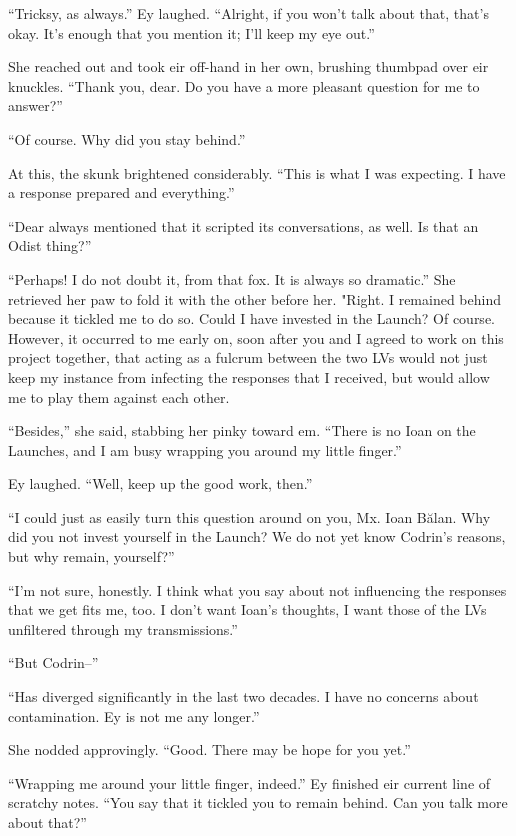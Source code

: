 ``Tricksy, as always.'' Ey laughed. ``Alright, if you won't talk about that, that's okay. It's enough that you mention it; I'll keep my eye out.''

She reached out and took eir off-hand in her own, brushing thumbpad over eir knuckles. ``Thank you, dear. Do you have a more pleasant question for me to answer?''

``Of course. Why did you stay behind.''

At this, the skunk brightened considerably. ``This is what I was expecting. I have a response prepared and everything.''

``Dear always mentioned that it scripted its conversations, as well. Is that an Odist thing?''

``Perhaps! I do not doubt it, from that fox. It is always so dramatic.'' She retrieved her paw to fold it with the other before her. "Right. I remained behind because it tickled me to do so. Could I have invested in the Launch? Of course. However, it occurred to me early on, soon after you and I agreed to work on this project together, that acting as a fulcrum between the two LVs would not just keep my instance from infecting the responses that I received, but would allow me to play them against each other.

``Besides,'' she said, stabbing her pinky toward em. ``There is no Ioan on the Launches, and I am busy wrapping you around my little finger.''

Ey laughed. ``Well, keep up the good work, then.''

``I could just as easily turn this question around on you, Mx. Ioan Bălan. Why did you not invest yourself in the Launch? We do not yet know Codrin's reasons, but why remain, yourself?''

``I'm not sure, honestly. I think what you say about not influencing the responses that we get fits me, too. I don't want Ioan's thoughts, I want those of the LVs unfiltered through my transmissions.''

``But Codrin--''

``Has diverged significantly in the last two decades. I have no concerns about contamination. Ey is not me any longer.''

She nodded approvingly. ``Good. There may be hope for you yet.''

``Wrapping me around your little finger, indeed.'' Ey finished eir current line of scratchy notes. ``You say that it tickled you to remain behind. Can you talk more about that?''

